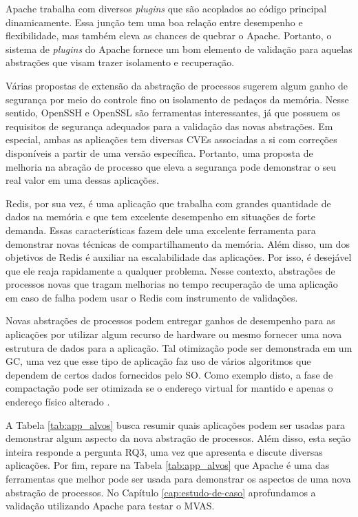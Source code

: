 Apache trabalha com diversos \textit{plugins} que são acoplados ao código
principal dinamicamente. Essa junção tem uma boa relação entre desempenho e
flexibilidade, mas também eleva as chances de quebrar o Apache.  Portanto, o
sistema de \textit{plugins} do Apache fornece um bom elemento de validação para
aquelas abstrações que visam trazer isolamento e recuperação.

Várias propostas de extensão da abstração de processos sugerem algum ganho de
segurança por meio do controle fino ou isolamento de pedaços da memória. Nesse
sentido, OpenSSH e OpenSSL são ferramentas interessantes, já que possuem os
requisitos de segurança adequados para a validação das novas abstrações. Em
especial, ambas as aplicações tem diversas CVEs associadas a si com correções
disponíveis a partir de uma versão específica. Portanto, uma proposta de
melhoria na abração de processo que eleva a segurança pode demonstrar o seu
real valor em uma dessas aplicações.

Redis, por sua vez, é uma aplicação que trabalha com grandes quantidade de
dados na memória e que tem excelente desempenho em situações de forte
demanda. Essas características fazem dele uma excelente ferramenta para
demonstrar novas técnicas de compartilhamento da memória. Além disso, um dos
objetivos de Redis é auxiliar na escalabilidade das aplicações. Por isso, é
desejável que ele reaja rapidamente a qualquer problema. Nesse contexto,
abstrações de processos novas que tragam melhorias no tempo recuperação de uma
aplicação em caso de falha podem usar o Redis com instrumento de validações.

Novas abstrações de processos podem entregar ganhos de desempenho para as
aplicações por utilizar algum recurso de hardware ou mesmo fornecer uma nova
estrutura de dados para a aplicação. Tal otimização pode ser demonstrada em um
GC, uma vez que esse tipo de aplicação faz uso de vários algoritmos que dependem
de certos dados fornecidos pelo SO. Como exemplo disto, a fase de compactação
pode ser otimizada se o endereço virtual for mantido e apenas o endereço físico
alterado \citep{pauseless}.

A Tabela \ref{tab:app_alvos} busca resumir quais aplicações podem ser usadas
para demonstrar algum aspecto da nova abstração de processos. Além disso, esta
seção inteira responde a pergunta RQ3, uma vez que apresenta e discute diversas
aplicações. Por fim, repare na Tabela \ref{tab:app_alvos} que Apache é uma das
ferramentas que melhor pode ser usada para demonstrar os aspectos de uma nova
abstração de processos. No Capítulo \ref{cap:estudo-de-caso} aprofundamos a
validação utilizando Apache para testar o MVAS.

